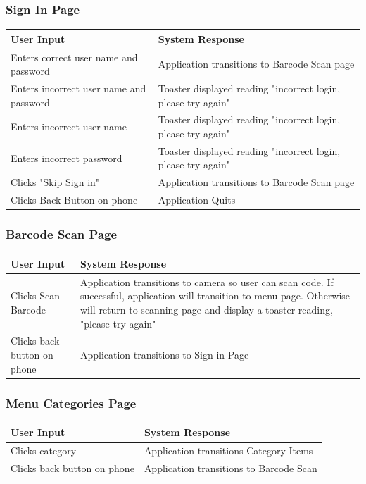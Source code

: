 \documentclass[12pt, titlepage]{article}
\begin{document}
\subsubsection{Sign In Page}
\begin{center}
    \begin{tabular}{ | l | p{8cm} |}
    \hline
    User Input & System Response \\ \hline
    Enters correct user name and password & Application transitions to Barcode Scan page \\ \hline
    Enters incorrect user name and password & Toaster displayed reading "incorrect login, please try again" \\ \hline
    Enters incorrect user name & Toaster displayed reading "incorrect login, please try again" \\ \hline
    Enters incorrect password & Toaster displayed reading "incorrect login, please try again" \\ \hline
    Clicks "Skip Sign in" & Application  transitions to Barcode Scan page\\ \hline
    Clicks Back Button on phone & Application Quits \\
    \hline
    \end{tabular}
\end{center}


\subsubsection{Barcode Scan Page}
\begin{center}
    \begin{tabular}{ | l | p{10cm} |}
    \hline
    User Input & System Response \\ \hline
    Clicks Scan Barcode & Application transitions to camera so user can scan code. If successful, application will transition to menu page. Otherwise will return to scanning page and display a toaster reading, "please try again" \\ \hline
    Clicks back button on phone & Application transitions to Sign in Page \\
    \hline
    \end{tabular}
\end{center}

\subsubsection{Menu Categories Page}
\begin{center}
    \begin{tabular}{ | l | p{10cm} |}
    \hline
    User Input & System Response \\ \hline
    Clicks category & Application transitions Category Items \\ \hline
    Clicks back button on phone & Application transitions to Barcode Scan \\
    \hline
    \end{tabular}
\end{center}
\end{document}
